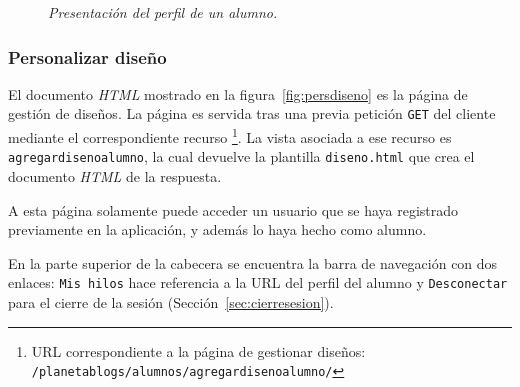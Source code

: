 \documentclass[a4paper, 12pt]{book}
\begin{document}
\begin{figure}
  \centering
  \caption{\textit{Presentaci\'on del perfil de un alumno.}}
  \label{fig:presentalumno}
\end{figure}


\subsubsection{Personalizar dise\~no} 
\label{sec:persdiseno}
El documento \textit{HTML} mostrado en la figura~\ref{fig:persdiseno} es la p\'agina de gesti\'on de dise\~nos. La p\'agina es servida 
tras una previa petici\'on \texttt{GET} del cliente mediante el correspondiente recurso \footnote{URL correspondiente a la p\'agina de gestionar dise\~nos: 
\texttt{/planetablogs/alumnos/agregardisenoalumno/}}. La vista asociada a ese recurso es \texttt{agregardisenoalumno}, la cual devuelve la plantilla 
\texttt{diseno.html} que crea el documento \textit{HTML} de la respuesta.

A esta p\'agina solamente puede acceder un usuario que se haya registrado previamente en la aplicaci\'on, y adem\'as lo haya hecho como alumno. 

En la parte superior de la cabecera se encuentra la barra de navegaci\'on con dos enlaces: \texttt{Mis hilos} hace referencia a la URL del perfil del alumno y \texttt{Desconectar} 
para el cierre de la sesi\'on (Secci\'on~\ref{sec:cierresesion}).
\end{document}

